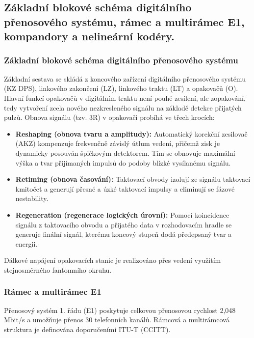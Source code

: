 \subsection{Základní blokové schéma digitálního přenosového systému, rámec a multirámec E1, kompandory a nelineární kodéry.}
    \subsubsection{Základní blokové schéma digitálního přenosového systému}
        Základní sestava se skládá z koncového zařízení digitálního přenosového systému (KZ DPS), linkového zakončení (LZ), linkového traktu (LT) a opakovačů (O). Hlavní funkcí opakovačů v digitálním traktu není pouhé zesílení, ale zopakování, tedy vytvoření zcela nového nezkresleného signálu na základě detekce přijatých pulzů.
        Obnova signálu (tzv. 3R) v opakovači probíhá ve třech krocích: 
        \begin{itemize}
            \item \textbf{Reshaping (obnova tvaru a amplitudy):} Automatický korekční zesilovač (AKZ) kompenzuje frekvenčně závislý útlum vedení, přičemž zisk je dynamicky posouván špičkovým detektorem. Tím se obnovuje maximální výška a tvar přijímaných impulsů do podoby blízké vysílanému signálu.
            \item \textbf{Retiming (obnova časování):} Taktovací obvody izolují ze signálu taktovací kmitočet a generují přesné a úzké taktovací impulsy a eliminují se fázové nestability.
            \item \textbf{Regeneration (regenerace logických úrovní):} Pomocí koincidence signálu z taktovacího obvodu a přijatého data v rozhodovacím hradle se generuje finální signál, kterému koncový stupeň dodá předepsaný tvar a energii.
        \end{itemize}
        Dálkové napájení opakovacích stanic je realizováno přes vedení využitím stejnosměrného fantomního okruhu.
    \subsubsection{Rámec a multirámec E1}
        Přenosový systém 1. řádu (E1) poskytuje celkovou přenosovou rychlost 2,048 Mbit/s a umožňuje přenos 30 telefonních kanálů. Rámcová a multirámcová struktura je definována doporučeními ITU-T (CCITT).
        

